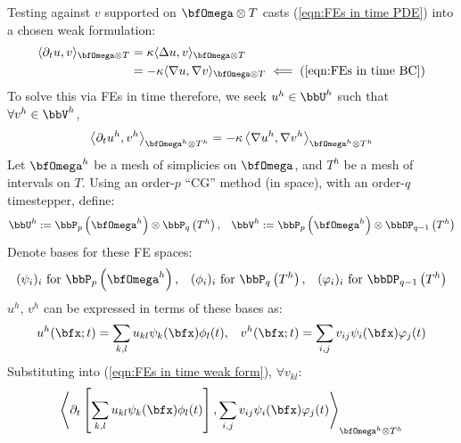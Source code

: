 \begin{example}
        Testing against $v$ supported on $\bfOmega\otimes T$ casts (\ref{eqn:FEs in time PDE}) into a chosen weak formulation:
        \begin{align}
            \langle\partial_{t}u, v\rangle_{\bfOmega\otimes T}  &=  \kappa\langle\Delta u, v\rangle_{\bfOmega\otimes T}  \\
                                                                &=   - \kappa\langle\nabla u, \nabla v\rangle_{\bfOmega\otimes T}  \impliedby  {\rm (\ref{eqn:FEs in time BC})}
        \end{align}
        To solve this via FEs in time therefore, we seek $u^{h}  \in  \bbU^{h}$ such that $\forall  v^{h}  \in  \bbV^{h}$,
        \begin{equation}\label{eqn:FEs in time weak form}
            \left\langle\partial_{t}u^{h}, v^{h}\right\rangle_{\bfOmega^{h}\otimes T^{h}}  =  - \kappa\left\langle\nabla u^{h}, \nabla v^{h}\right\rangle_{\bfOmega^{h}\otimes T^{h}}
        \end{equation}
        Let $\bfOmega^{h}$ be a mesh of simplicies on $\bfOmega$, and $T^{h}$ be a mesh of intervals on $T$. Using an order-$p$ ``CG'' method (in space), with an order-$q$ timestepper, define:
        \begin{align}
            \bbU^{h}  :=  \bbP_{p}\left(\bfOmega^{h}\right)\otimes\bbP_{q}\left(T^{h}\right),  &&
            \bbV^{h}  :=  \bbP_{p}\left(\bfOmega^{h}\right)\otimes\bbDP_{q - 1}\left(T^{h}\right)
        \end{align}
        Denote bases for these FE spaces:
        \begin{align}
            (\psi_{i})_{i}     \text{ for }  \bbP_{p}\left(\bfOmega^{h}\right),  &&
            (\phi_{i})_{i}     \text{ for }  \bbP_{q}\left(T^{h}\right),  &&
            (\varphi_{i})_{i}  \text{ for }  \bbDP_{q - 1}\left(T^{h}\right)
        \end{align}
        $u^{h}$, $v^{h}$ can be expressed in terms of these bases as:
        \begin{align}
            u^{h}(\bfx; t)  =  \sum_{k, l}u_{kl}\psi_{k}(\bfx)\phi_{l}(t),  &&
            v^{h}(\bfx; t)  =  \sum_{i, j}v_{ij}\psi_{i}(\bfx)\varphi_{j}(t)
        \end{align}
        Substituting into (\ref{eqn:FEs in time weak form}), $\forall  v_{kl}$:
        \begin{multline}
            \left\langle\partial_{t}\left[\sum_{k, l}u_{kl}\psi_{k}(\bfx)\phi_{l}(t)\right], \sum_{i, j}v_{ij}\psi_{i}(\bfx)\varphi_{j}(t)\right\rangle_{\bfOmega^{h}\otimes T^{h}}  \\

\end{multline}
\end{example}
